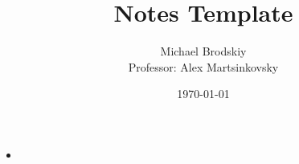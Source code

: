 

\title{Notes Template}
\date{\today}
\author{Michael Brodskiy\\ \small Professor: Alex Martsinkovsky}



\maketitle

\begin{itemize}

  \item

\end{itemize}



